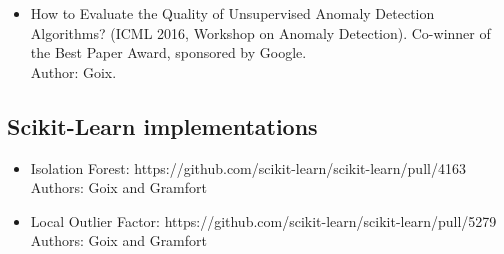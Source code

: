 \begin{listpublis}
\begin{itemize}
\item How to Evaluate the Quality of Unsupervised Anomaly Detection Algorithms? (ICML 2016, Workshop on Anomaly Detection). Co-winner of the Best Paper Award, sponsored by Google.\\
Author: Goix. 
\end{itemize}

\subsection*{Scikit-Learn implementations}
\begin{itemize}
\item Isolation Forest: https://github.com/scikit-learn/scikit-learn/pull/4163\\
Authors: Goix and Gramfort
\item Local Outlier Factor: https://github.com/scikit-learn/scikit-learn/pull/5279\\
Authors: Goix and Gramfort
\end{itemize}

  
\end{listpublis}